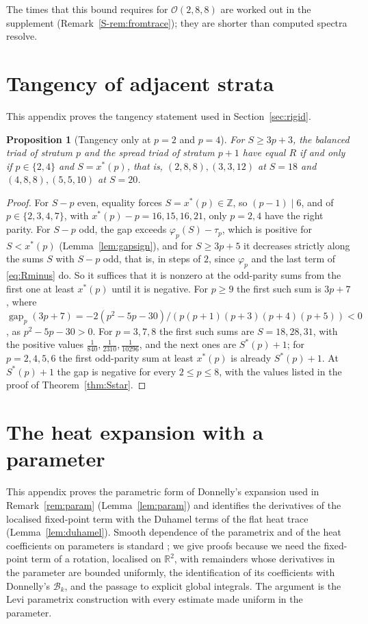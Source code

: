 \documentclass[pdflatex,sn-mathphys-num]{sn-jnl}
\theoremstyle{thmstyleone}%
\newtheorem{proposition}[theorem]{Proposition}%
\theoremstyle{thmstylethree}%
\newcommand{\Orb}{\mathcal{O}}
\newcommand{\R}{\mathbb{R}}
\newcommand{\Z}{\mathbb{Z}}
\newcommand{\sref}[1]{\ref*{S-#1}}%
\begin{document}
\begin{appendices}
The times that this bound requires for $\Orb(2,8,8)$ are worked out in the supplement (Remark~\sref{rem:fromtrace}); they are shorter than computed spectra resolve.


\section{Tangency of adjacent strata}\label{app:tangency}

This appendix proves the tangency statement used in Section~\ref{sec:rigid}.

\begin{proposition}[Tangency only at $p=2$ and $p=4$]\label{prop:tangency}
For $S\ge3p+3$, the balanced triad of stratum $p$ and the spread triad of stratum $p+1$ have equal $R$ if and only if $p\in\{2,4\}$ and $S=x^*(p)$, that is, $(2,8,8),(3,3,12)$ at $S=18$ and $(4,8,8),(5,5,10)$ at $S=20$.
\end{proposition}

\begin{proof}
For $S-p$ even, equality forces $S=x^*(p)\in\Z$, so $(p-1)\mid6$, and of $p\in\{2,3,4,7\}$, with $x^*(p)-p=16,15,16,21$, only $p=2,4$ have the right parity. For $S-p$ odd, the gap exceeds $\varphi_p(S)-\tau_p$, which is positive for $S<x^*(p)$ (Lemma~\ref{lem:gapsign}), and for $S\ge3p+5$ it decreases strictly along the sums $S$ with $S-p$ odd, that is, in steps of $2$, since $\varphi_p$ and the last term of \eqref{eq:Rminus} do. So it suffices that it is nonzero at the odd-parity sums from the first one at least $x^*(p)$ until it is negative. For $p\ge9$ the first such sum is $3p+7$, where $\operatorname{gap}_p(3p+7)=-2(p^2-5p-30)/(p(p+1)(p+3)(p+4)(p+5))<0$, as $p^2-5p-30>0$. For $p=3,7,8$ the first such sums are $S=18,28,31$, with the positive values $\frac1{840},\frac1{2310},\frac1{10296}$, and the next ones are $S^*(p)+1$; for $p=2,4,5,6$ the first odd-parity sum at least $x^*(p)$ is already $S^*(p)+1$. At $S^*(p)+1$ the gap is negative for every $2\le p\le8$, with the values listed in the proof of Theorem~\ref{thm:Sstar}.
\end{proof}

\section{The heat expansion with a parameter}\label{app:param}

This appendix proves the parametric form of Donnelly's expansion used in Remark~\ref{rem:param} (Lemma~\ref{lem:param}) and identifies the derivatives of the localised fixed-point term with the Duhamel terms of the flat heat trace (Lemma~\ref{lem:duhamel}). Smooth dependence of the parametrix and of the heat coefficients on parameters is standard \cite{gilkey1995,bgv1992}; we give proofs because we need the fixed-point term of a rotation, localised on $\R^2$, with remainders whose derivatives in the parameter are bounded uniformly, the identification of its coefficients with Donnelly's $\mathcal B_k$, and the passage to explicit global integrals. The argument is the Levi parametrix construction with every estimate made uniform in the parameter.


\end{appendices}
\end{document}
